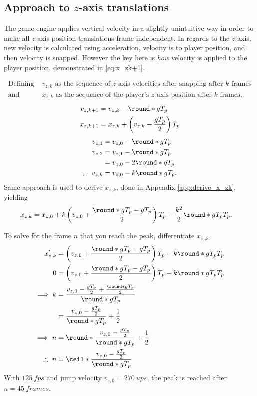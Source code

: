 \subsection{Approach to $z$-axis translations}
\label{sec:x_z}
The game engine applies vertical velocity in a slightly unintuitive way in order to make all $z$-axis position translations frame independent.
In regards to the $z$-axis, new velocity is calculated using acceleration, velocity is to player position, and then velocity is snapped.
However the key here is \emph{how} velocity is applied to the player position, demonstrated in \eqref{eq:x_zk+1}.

\begin{align*}
\text{Defining }&v_{z,k}\text{ as the sequence of $z$-axis velocities after snapping after $k$ frames}\\
\text{and }&x_{z,k}\text{ as the sequence of the player's $z$-axis position after $k$ frames},
\end{align*}
\begin{align}
\label{eq:v_zk+1}
v_{z,k+1} &= v_{z,k} - \round*{gT_p}\\
\label{eq:x_zk+1}
x_{z,k+1} &= x_{z,k} + \left(v_{z,k} - \frac{gT_p}{2} \right) T_p
\end{align}
\begin{align}
\nonumber
v_{z,1} &= v_{z,0} - \round*{gT_p}\\\nonumber
v_{z,2} &= v_{z,1} - \round*{gT_p}\\\nonumber
&= v_{z,0} - 2\round*{gT_p}\\
\label{eq:v_zk}
\therefore\ v_{z,k} &= v_{z,0} - k\round*{gT_p}.
\end{align}
Same approach is used to derive $x_{z,k}$, done in Appendix \ref{app:derive_x_zk}, yielding
\begin{align}
\label{eq:x_zk}
x_{z,k} &= x_{z,0} + k\left(v_{z,0} + \frac{\round*{gT_p} - gT_p}{2} \right) T_p - \frac{k^2}{2} \round*{gT_p} T_p.
\end{align}

To solve for the frame $n$ that you reach the peak, differentiate $x_{z,k}$.
\begin{align}
\nonumber
x_{z,k}' &= \left(v_{z,0} + \frac{\round*{gT_p} - gT_p}{2} \right) T_p - k\round*{gT_p} T_p\\\nonumber
0 &= \left(v_{z,0} + \frac{\round*{gT_p} - gT_p}{2} \right) T_p - k\round*{gT_p} T_p\\\nonumber
\implies k &= \frac{v_{z,0} - \frac{gT_p}{2} + \frac{\round*{gT_p}}{2}}{\round*{gT_p}}\\\nonumber
&= \frac{v_{z,0} - \frac{gT_p}{2}}{\round*{gT_p}} + \frac{1}{2}\\\nonumber
\implies n &= \round*{\frac{v_{z,0} - \frac{gT_p}{2}}{\round*{gT_p}} + \frac{1}{2}}\\
\therefore\ n &= \ceil*{\frac{v_{z,0} - \frac{gT_p}{2}}{\round*{gT_p}}}
\end{align}
With $\qty{125}{fps}$ and jump velocity $v_{z,0} = \qty{270}{ups}$, the peak is reached after $n = \qty{45}{frames}$.\\

